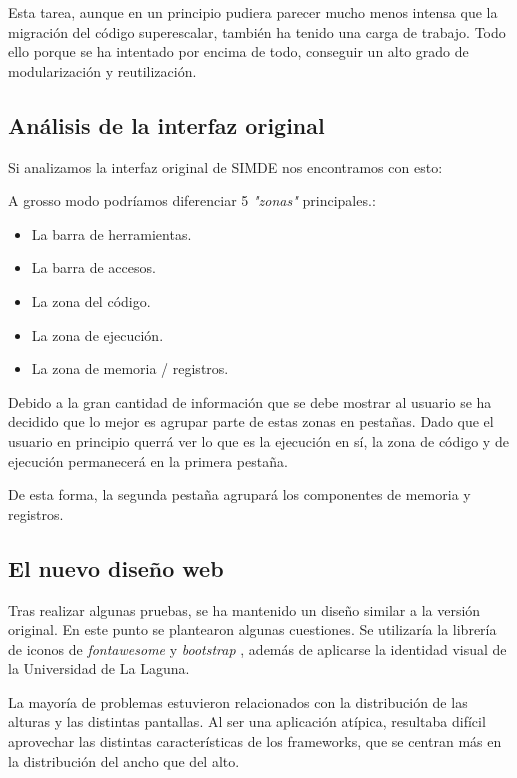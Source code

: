 Esta tarea, aunque en un principio pudiera parecer mucho menos intensa que la migración del código 
superescalar, también ha tenido una carga de trabajo. Todo ello porque se ha intentado por encima 
de todo, conseguir un alto grado de modularización y reutilización. 

\subsection{Análisis de la interfaz original}

Si analizamos la interfaz original de SIMDE nos encontramos con esto: 

A grosso modo podríamos diferenciar 5 \textit{"zonas"} principales.:

\begin{itemize}

\item La barra de herramientas.

\item La barra de accesos.

\item La zona del código.

\item La zona de ejecución.

\item La zona de memoria / registros. 

\end{itemize}

Debido a la gran cantidad de información que se debe mostrar al usuario se ha decidido que lo mejor 
es agrupar parte de estas zonas en pestañas. Dado que el usuario en principio querrá ver lo que es 
la ejecución en sí, la zona de código y de ejecución permanecerá en la primera pestaña.

\bigskip
De esta forma, la segunda pestaña agrupará los componentes de memoria y registros.

\subsection{El nuevo diseño web}

Tras realizar algunas pruebas, se ha mantenido un diseño similar a la versión original. En este punto
se plantearon algunas cuestiones. Se utilizaría la librería de iconos de \textit{fontawesome} 
\cite{fontawesome} y \textit{bootstrap} \cite{bootstrap} , además de aplicarse la identidad visual de la Universidad de La Laguna.

\bigskip
La mayoría de problemas estuvieron relacionados con la distribución de las alturas y las distintas pantallas.
Al ser una aplicación atípica, resultaba difícil aprovechar las distintas características de los frameworks, 
que se centran más en la distribución del ancho que del alto.


